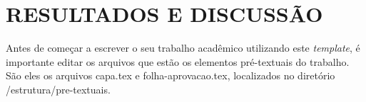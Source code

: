 
\chapter{RESULTADOS E DISCUSSÃO}
\label{chap:resultadosDiscussao}

Antes de começar a escrever o seu trabalho acadêmico utilizando este \emph{template}, é importante editar os arquivos que estão os elementos pré-textuais do trabalho.
São eles os arquivos {\ttfamily capa.tex} e {\ttfamily folha-aprovacao.tex}, localizados no diretório  {\ttfamily /estrutura/pre-textuais}.